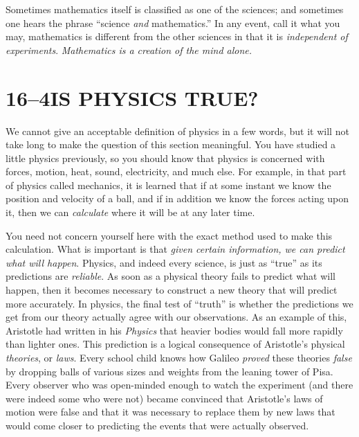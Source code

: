\documentclass[11pt]{book}
\theoremstyle{bkplain}
\theoremstyle{XIplainnote}
\theoremstyle{bkplain}
\theoremstyle{bkplain}
\begin{document}
Sometimes mathematics itself is classified as one of the sciences; and
sometimes one hears the phrase ``science \emph{and} mathematics.'' In any
event, call it what you may, mathematics is different from the other sciences
in that it is \emph{independent of experiments}. \emph{Mathematics is a
creation of the mind alone.}

\section*{16--4\quad IS PHYSICS TRUE?}

We cannot give an acceptable definition of physics in a few words, but it will
not take long to make the question of this section meaningful. You have
studied a little physics previously, so you should know that physics is
concerned with forces, motion, heat, sound, electricity, and much else. For
example, in that part of physics called mechanics, it is learned that if at
some instant we know the position and velocity of a ball, and if in addition
we know the forces acting upon it, then we can \emph{calculate} where it will
be at any later time.

You need not concern yourself here with the exact method used to make this
calculation. What is important is that \emph{given certain information, we can
predict what will happen}. Physics, and indeed every science, is just as
``true'' as its predictions are \emph{reliable}. As soon as a physical theory
fails to predict what will happen, then it becomes necessary to construct a
new theory that will predict more accurately. In physics, the final test of
``truth'' is whether the predictions we get from our theory actually agree
with our observations. As an example of this, Aristotle had written in his
\emph{Physics} that heavier bodies would fall more rapidly than lighter ones.
This prediction is a logical consequence of Aristotle's physical
\emph{theories}, or \emph{laws}. Every school child knows how Galileo
\emph{proved} these theories \emph{false} by dropping balls of various sizes
and weights from the leaning tower of Pisa. Every observer who was open-minded
enough to watch the experiment (and there were indeed some who were not)
became convinced that Aristotle's laws of motion were false and that it was
necessary to replace them by new laws that would come closer to predicting the
events that were actually observed.
\end{document}
